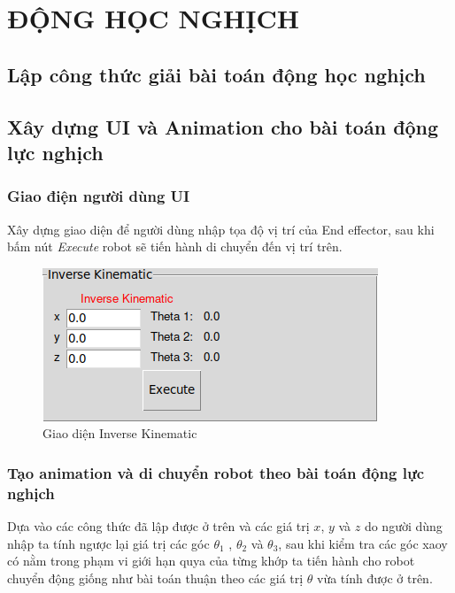 \section{ĐỘNG HỌC NGHỊCH}
\subsection{Lập công thức giải bài toán động học nghịch}

\subsection{Xây dựng UI và Animation cho bài toán động lực nghịch}
\subsubsection{Giao điện người dùng UI}

Xây dựng giao diện để người dùng nhập tọa độ vị trí của End effector, sau khi bấm nút \textit{Execute} robot sẽ tiến hành di chuyển đến vị trí trên.

\begin{figure}[H]
	\centering
	\includegraphics[width=1\linewidth]{Images/inv_ui.png}
	\caption{Giao diện Inverse Kinematic}
	\label{fig:enter-label8}
\end{figure}

\subsubsection{Tạo animation và di chuyển robot theo bài toán động lực nghịch}

Dựa vào các công thức đã lập được ở trên và các giá trị $x$, $y$ và $z$ do người dùng nhập ta tính ngược lại giá trị các góc $\theta_{1}$ , $\theta_{2}$ và $\theta_{3}$, sau khi kiểm tra các góc xaoy có nằm trong phạm vi giới hạn quya của từng khớp ta tiến hành cho robot chuyển động giống như bài toán thuận theo các giá trị $\theta$ vừa tính được ở trên.

